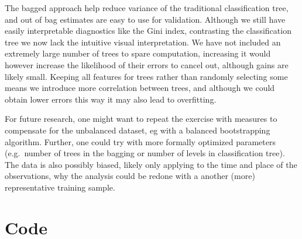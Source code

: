 \documentclass[
]{article}
\begin{document}
The bagged approach help reduce variance of the traditional
classification tree, and out of bag estimates are easy to use for
validation. Although we still have easily interpretable diagnostics like
the Gini index, contrasting the classification tree we now lack the
intuitive visual interpretation. We have not included an extremely large
number of trees to spare computation, increasing it would however
increase the likelihood of their errors to cancel out, although gains
are likely small. Keeping all features for trees rather than randomly
selecting some means we introduce more correlation between trees, and
although we could obtain lower errors this way it may also lead to
overfitting.

For future research, one might want to repeat the exercise with measures
to compensate for the unbalanced dataset, eg with a balanced
bootstrapping algorithm. Further, one could try with more formally
optimized parameters (e.g.~number of trees in the bagging or number of
levels in classification tree). The data is also possibly biased, likely
only applying to the time and place of the observations, why the
analysis could be redone with a another (more) representative training
sample.

\hypertarget{code}{%
\section{Code}\label{code}}
\end{document}
